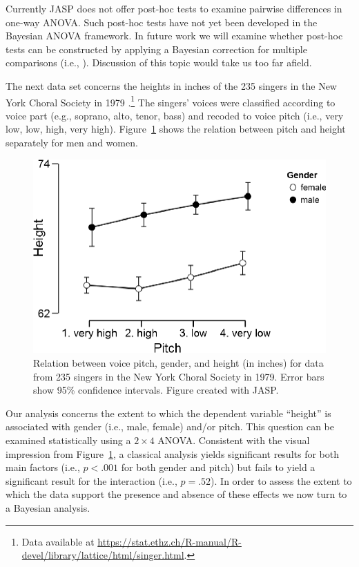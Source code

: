Currently JASP does not offer post-hoc tests to examine pairwise differences in one-way ANOVA. Such post-hoc tests have not yet been developed in the Bayesian ANOVA framework. In future work we will examine whether post-hoc tests can be constructed by applying a Bayesian correction for multiple comparisons (i.e., ). Discussion of this topic would take us too far afield.

The next data set concerns the heights in inches of the 235 singers in the New York Choral Society in 1979 \cite{ChambersEtAl1983}.\footnote{Data available at \url{https://stat.ethz.ch/R-manual/R-devel/library/lattice/html/singer.html}.} The singers' voices were classified according to voice part (e.g., soprano, alto, tenor, bass) and recoded to voice pitch (i.e., very low, low, high, very high). Figure~\ref{fig:bi2:DataSingers} shows the relation between pitch and height separately for men and women.

\begin{figure}[tp]
    \begin{center}
        \includegraphics[width=.65\textwidth]{figs/bi2_DataSingers.eps}
        \caption{Relation between voice pitch, gender, and height (in inches) for data from 235 singers in the New York Choral Society in 1979. Error bars show 95\% confidence intervals. Figure created with JASP.}%
         \label{fig:bi2:DataSingers}
    \end{center}
\end{figure}

Our analysis concerns the extent to which the dependent variable ``height'' is associated with gender (i.e., male, female) and/or pitch. This question can be examined statistically using a $2\times4$ ANOVA. Consistent with the visual impression from Figure~\ref{fig:bi2:DataSingers}, a classical analysis yields significant results for both main factors (i.e., $p<.001$ for both gender and pitch) but fails to yield a significant result for the interaction (i.e., $p=.52$). In order to assess the extent to which the data support the presence and absence of these effects we now turn to a Bayesian analysis.

